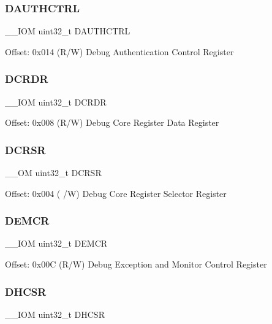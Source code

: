 \subsubsection{\texorpdfstring{DAUTHCTRL}{DAUTHCTRL}}
{\footnotesize\ttfamily \+\_\+\+\_\+\+I\+OM uint32\+\_\+t D\+A\+U\+T\+H\+C\+T\+RL}

Offset\+: 0x014 (R/W) Debug Authentication Control Register \mbox{\label{struct_core_debug___type_ad1dbd0dd98b6d9327f70545e0081ddbf}} 
\subsubsection{\texorpdfstring{DCRDR}{DCRDR}}
{\footnotesize\ttfamily \+\_\+\+\_\+\+I\+OM uint32\+\_\+t D\+C\+R\+DR}

Offset\+: 0x008 (R/W) Debug Core Register Data Register \mbox{\label{struct_core_debug___type_ab74a9ec90ad18e4f7a20362d362b754a}} 
\subsubsection{\texorpdfstring{DCRSR}{DCRSR}}
{\footnotesize\ttfamily \+\_\+\+\_\+\+OM uint32\+\_\+t D\+C\+R\+SR}

Offset\+: 0x004 ( /W) Debug Core Register Selector Register \mbox{\label{struct_core_debug___type_aa99de5f8c609f10c25ed51f57b2edd74}} 
\subsubsection{\texorpdfstring{DEMCR}{DEMCR}}
{\footnotesize\ttfamily \+\_\+\+\_\+\+I\+OM uint32\+\_\+t D\+E\+M\+CR}

Offset\+: 0x00C (R/W) Debug Exception and Monitor Control Register \mbox{\label{struct_core_debug___type_a94ca828091a9226ab6684fbf30e52909}} 
\subsubsection{\texorpdfstring{DHCSR}{DHCSR}}
{\footnotesize\ttfamily \+\_\+\+\_\+\+I\+OM uint32\+\_\+t D\+H\+C\+SR}

